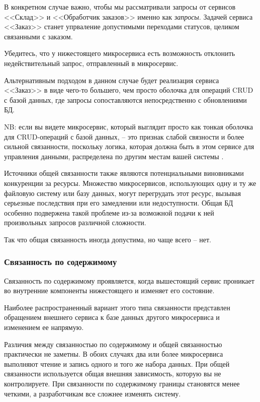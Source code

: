 \documentclass[%
	11pt,
	a4paper,
	utf8,
		]{article}
\begin{document}
В конкретном случае важно, чтобы мы рассматривали запросы от сервисов <<Склад>> и <<Обработчик заказов>> именно как \emph{запросы}. Задачей сервиса <<Заказ>> станет упрваление допустимыми переходами статусов, целиком связанными с заказом.

Убедитесь, что у нижестоящего микросервиса есть возможность отклонить недействительный запрос, отправленный в микросервис.

Альтернативным подходом в данном случае будет реализация сервиса <<Заказ>> в виде чего-то большего, чем просто оболочка для операций CRUD с базой данных, где запросы сопоставляются непосредственно с обновлениями БД.

NB: если вы видете микросервис, который выглядит просто как тонкая оболочка для CRUD-операций с базой данных, -- это признак слабой связности и более сильной связанности, поскольку логика, которая должна быть в этом сервисе для управления данными, распределена по другим местам вашей системы \cite[]{microservices-2024}.

Источники общей связанности также являются потенциальными виновниками конкуренции за ресурсы. Множество микросервисов, использующих одну и ту же файловую систему или базу данных, могут перегрудать этот ресурс, вызывая серьезные последствия при его замедлении или недоступности. Общая БД особенно подвержена такой проблеме из-за возможной подачи к ней произвольных запросов различной сложности.

Так что общая связанность иногда допустима, но чаще всего -- нет.

\subsubsection{Связанность по содержимому}

Связанность по содержимому проявляется, когда вышестоящий сервис проникает во внутренние компоненты нижестоящего и изменяет его состояние.

Наиболее распространенный вариант этого типа связанности представлен обращением внешнего сервиса к базе данных другого микросервиса и изменением ее напрямую.

Различия между связанностью по содержимому и общей связанностью практически не заметны. В обоих случаях два или более микросервиса выполняют чтение и запись одного и того же набора данных. При общей связанности используется общая внешняя зависимость, которую вы не контролируете. При связанности по содержимому границы становятся менее четкими, а разработчикам все сложнее изменять систему.
\end{document}
